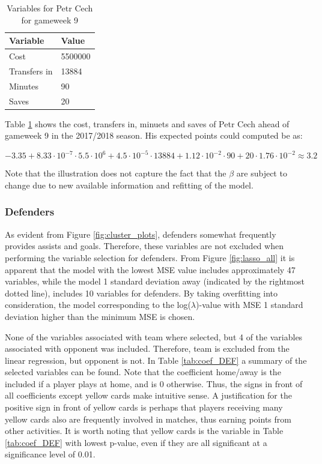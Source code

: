 \begin{table}[H]
\centering
\begin{tabular}{|l|l|}
\hline
Variable     & Value   \\ \hline
Cost         & 5500000 \\
Transfers in & 13884   \\
Minutes      & 90      \\
Saves        & 20     \\
\hline
\end{tabular}
\caption{Variables for Petr Cech for gameweek 9}
\label{tab:var_petr}
\end{table}

Table \ref{tab:var_petr} shows the cost, transfers in, minuets and saves of Petr Cech ahead of gameweek 9 in the 2017/2018 season. His expected points could computed be as:

\begin{equation*}
    -3.35 + 8.33\cdot10^{-7}\cdot5.5\cdot10^6 + 4.5\cdot10^{-5}\cdot13884 + 1.12\cdot10^{-2}\cdot90 + 20\cdot1.76\cdot10^{-2} \approx 3.2
\end{equation*}

Note that the illustration does not capture the fact that the $\beta$ are subject to change due to new available information and refitting of the model.


\subsubsection{Defenders}
As evident from Figure \ref{fig:cluster_plots}, defenders somewhat frequently provides assists and goals. Therefore, these variables are not excluded when performing the variable selection for defenders. From Figure \ref{fig:lasso_all} it is apparent that the model with the lowest MSE value includes approximately 47 variables, while the model 1 standard deviation away (indicated by the rightmost dotted line), includes 10 variables for defenders. By taking overfitting into consideration, the model corresponding to the log($\lambda$)-value with MSE 1 standard deviation higher than the minimum MSE is chosen.

\newpar

None of the variables associated with team where selected, but 4 of the variables associated with opponent was included. Therefore, team is excluded from the linear regression, but opponent is not. In Table \ref{tab:coef_DEF} a summary of the selected variables can be found. Note that the coefficient home/away is the included if a player plays at home, and is 0 otherwise. Thus, the signs in front of all coefficients except yellow cards make intuitive sense. A justification for the positive sign in front of yellow cards is perhaps that players receiving many yellow cards also are frequently involved in matches, thus earning points from other activities. It is worth noting that yellow cards is the variable in Table \ref{tab:coef_DEF} with lowest p-value, even if they are all significant at a significance level of 0.01.

